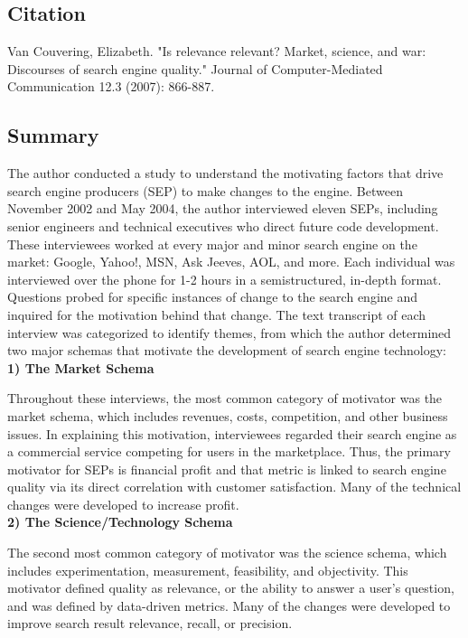 \documentclass[../summaries.tex]{subfiles}
\begin{document}
\subsection{Citation}
Van Couvering, Elizabeth. "Is relevance relevant? Market, science, and war: Discourses of search engine quality." Journal of Computer-Mediated Communication 12.3 (2007): 866-887.

\subsection{Summary}
The author conducted a study to understand the motivating factors that drive search engine producers (SEP) to make changes to the engine. Between November 2002 and May 2004, the author interviewed eleven SEPs, including senior engineers and technical executives who direct future code development. These interviewees worked at every major and minor search engine on the market:  Google, Yahoo!, MSN, Ask Jeeves, AOL, and more. Each individual was interviewed over the phone for 1-2 hours in a semistructured, in-depth format. Questions probed for specific instances of change to the search engine and inquired for the motivation behind that change. The text transcript of each interview was categorized to identify themes, from which the author determined two major schemas that motivate the development of search engine technology:\\

\textbf{1) The Market Schema}

Throughout these interviews, the most common category of motivator was the market schema, which includes revenues, costs, competition, and other business issues. In explaining this motivation, interviewees regarded their search engine as a commercial service competing for users in the marketplace. Thus, the primary motivator for SEPs is financial profit and that metric is linked to search engine quality via its direct correlation with customer satisfaction. Many of the technical changes were developed to increase profit.\\

\textbf{2) The Science/Technology Schema}

The second most common category of motivator was the science schema, which includes experimentation, measurement, feasibility, and objectivity. This motivator defined quality as relevance, or the ability to answer a user's question, and was defined by data-driven metrics. Many of the changes were developed to improve search result relevance, recall, or precision.\\
\end{document}
